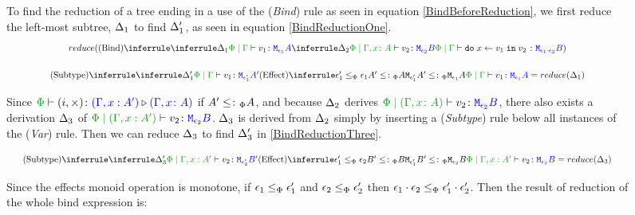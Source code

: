 \documentclass{Report}
\begin{document}
\begin{figure}
\begin{framed}

    To find the reduction of a tree ending in a use of the (\textit{Bind}) rule as seen in equation \ref{BindBeforeReduction}, we first reduce the left-most subtree, $\Delta_1$ to find $\Delta_1'$, as seen in equation \ref{BindReductionOne}.
    \begin{equation}\label{BindBeforeReduction}
        \scalebox{.8}{$
        \reduce(
            \ntreeruleII{Bind}{
                \treeruleI{
                    \D_1
                }{
                    \gpetyperelation{v_1}{\M{\e_1}{A}}
                }
            }{
                \treeruleI{
                    \D_2
                }{
                    \etyperelation{\P}{\gax}{v_2}{\M{\e_2}{B}}
                }
            } {
                \gpetyperelation{\doin{x}{v_1}{v_2}}{\M{\e_1\dot\e_2}{B}}
            }
        )
        $}
    \end{equation}


    \begin{equation}\label{BindReductionOne}
        \scalebox{.8}{$
        \ntreeruleII{Subtype}{
            \treeruleI{\D'_1}{\gpetyperelation{v_1}{\M{\e'_1}{A'}}}
        }{
        \subeffecttreep{\e_1'}{A'}{\e_1}{A}
        }{
            \gpetyperelation{v_1}{\M{\e_1}{A}}
        } = \reduce(\D_1)
        $}
    \end{equation}

    Since $\ewrel{\P}{(i,\x)}{(\G, x: A')}{(\gax)}$ if $A' \leq\colon_\Phi A$, and because $\Delta_2$ derives $\etyperelation{\P}{(\gax)}{v_2}{\M{\e_2}{B}}$, there also exists a derivation $\Delta_3$ of $\etyperelation{\P}{(\G, x: A')}{v_2}{\M{\e_2}{B}}$. $\Delta_3$ is derived from $\Delta_2$ simply by inserting a (\textit{Subtype}) rule below all instances of the (\textit{Var}) rule. Then we can reduce $\Delta_3$ to find $\Delta_3'$ in \ref{BindReductionThree}.

    \begin{equation}\label{BindReductionThree}
        \scalebox{.8}{$
        \ntreeruleII{Subtype}{
            \treeruleI{\D'_3}{\etyperelation{\P}{\G, x: A'}{v_2}{\M{\e'_2}{B'}}}
        }{
        \subeffecttreep{\e_1'}{B'}{\e_2}{B}
        }{
            \etyperelation{\P}{\G, x: A'}{v_2}{\M{\e_2}{B}}
        } = \reduce(\D_3)
        $}
    \end{equation}
    

    Since the effects monoid operation is monotone, if $\epsilon_1\leq_{\Phi}\epsilon_1'$ and $\epsilon_2\leq_{\Phi}\epsilon_2'$ then $\epsilon_1\cdot\epsilon_2 \leq_{\Phi} \epsilon_1'\cdot\epsilon_2'$. Then the result of reduction of the whole bind expression is:



\end{framed}
\end{figure}
\end{document}
